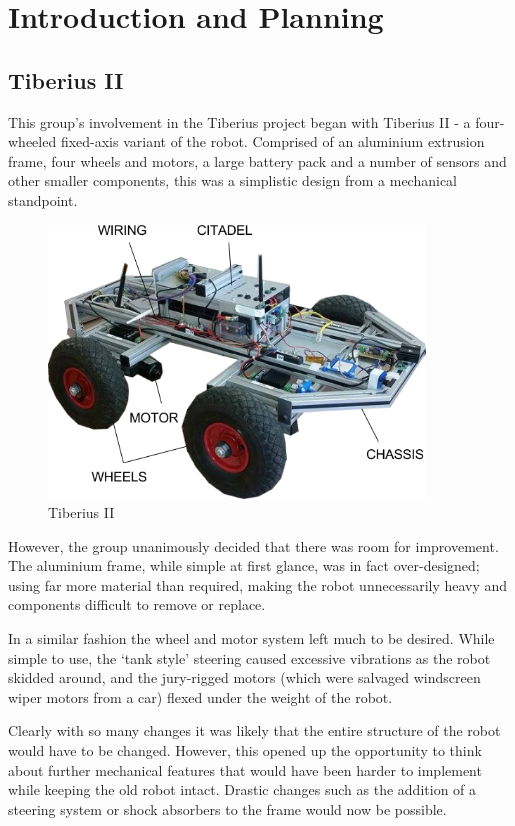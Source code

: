 \section{Introduction and Planning}
\subsection{Tiberius II}

This group's involvement in the Tiberius project began with Tiberius II - a four-wheeled fixed-axis variant of the robot. Comprised of an aluminium extrusion frame, four wheels and motors, a large battery pack and a number of sensors and other smaller components, this was a simplistic design from a mechanical standpoint.

\begin{figure}[!htb]
\begin{center}
\includegraphics[width=10cm]{mechanical/figures_mech/mech_Tib_old_diagram.png}
\end{center}
\caption{Tiberius II}
\label{fig:mech_old}
\end{figure}

However, the group unanimously decided that there was room for improvement. The aluminium frame, while simple at first glance, was in fact over-designed; using far more material than required, making the robot unnecessarily heavy and components difficult to remove or replace.

In a similar fashion the wheel and motor system left much to be desired. While simple to use, the `tank style' steering caused excessive vibrations as the robot skidded around, and the jury-rigged motors (which were salvaged windscreen wiper motors from a car) flexed under the weight of the robot.

Clearly with so many changes it was likely that the entire structure of the robot would have to be changed. However, this opened up the opportunity to think about further mechanical features that would have been harder to implement while keeping the old robot intact. Drastic changes such as the addition of a steering system or shock absorbers to the frame would now be possible.

